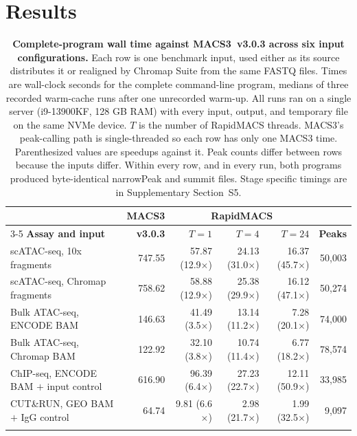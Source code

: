 \documentclass[namedate,webpdf,contemporary,large]{oup-authoring-template}
\begin{document}
\section{Results}
\begin{table}[!t]
\begin{center}
\begin{minipage}{\textwidth}
\caption{\textbf{Complete-program wall time against MACS3~v3.0.3 across six input configurations.} Each row is one benchmark input, used either as its source distributes it or realigned by Chromap Suite from the same FASTQ files. Times are wall-clock seconds for the complete command-line program, medians of three recorded warm-cache runs after one unrecorded warm-up. All runs ran on a single server (i9-13900KF, 128 GB RAM) with every input, output, and temporary file on the same NVMe device. $T$ is the number of RapidMACS threads. MACS3's peak-calling path is single-threaded so each row has only one MACS3 time. Parenthesized values are speedups against it. Peak counts differ between rows because the inputs differ. Within every row, and in every run, both programs produced byte-identical narrowPeak and summit files. Stage specific timings are in Supplementary Section~S5.\label{tab:stages}}
\footnotesize
\setlength{\tabcolsep}{4pt}
\begin{tabular*}{\textwidth}{@{\extracolsep{\fill}}lrrrrr@{}}
\toprule
& \textbf{MACS3} & \multicolumn{3}{c}{\textbf{RapidMACS}} &\\
\cline{3-5}
\textbf{Assay and input} & \textbf{v3.0.3} & $T{=}1$ & $T{=}4$ & $T{=}24$
& \textbf{Peaks}\\
\midrule
scATAC-seq, 10x fragments & 747.55 & 57.87 (12.9$\times$) & 24.13 (31.0$\times$) & 16.37 (45.7$\times$) & 50{,}003\\
scATAC-seq, Chromap fragments & 758.62 & 58.88 (12.9$\times$) & 25.38 (29.9$\times$) & 16.12 (47.1$\times$) & 50{,}274\\[2pt]
Bulk ATAC-seq, ENCODE BAM & 146.63 & 41.49 (3.5$\times$) & 13.14 (11.2$\times$) & 7.28 (20.1$\times$) & 74{,}000\\
Bulk ATAC-seq, Chromap BAM & 122.92 & 32.10 (3.8$\times$) & 10.74 (11.4$\times$) & 6.77 (18.2$\times$) & 78{,}574\\[2pt]
ChIP-seq, ENCODE BAM $+$ input control & 616.90 & 96.39 (6.4$\times$) & 27.23 (22.7$\times$) & 12.11 (50.9$\times$) & 33{,}985\\
CUT\&RUN, GEO BAM $+$ IgG control & 64.74 & 9.81 (6.6$\times$) & 2.98 (21.7$\times$) & 1.99 (32.5$\times$) & 9{,}097\\
\botrule
\end{tabular*}
\end{minipage}
\end{center}
\end{table}
\end{document}
